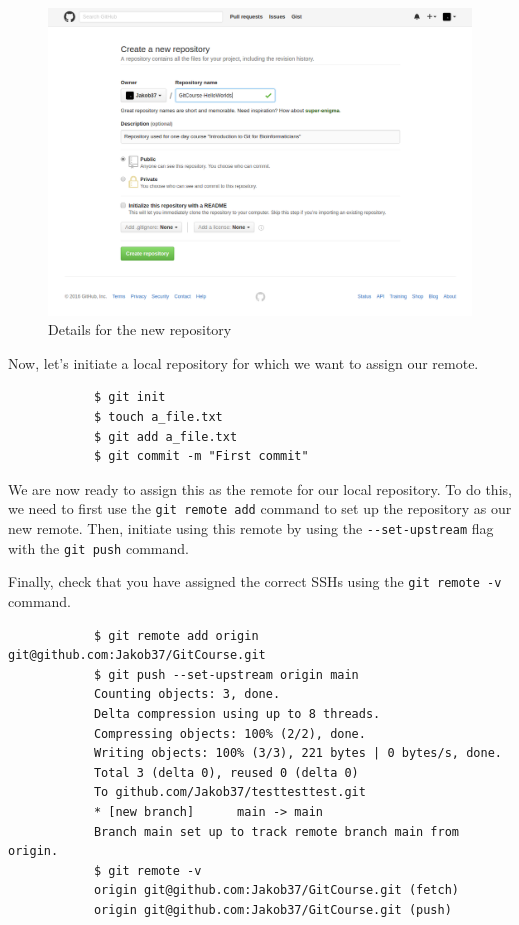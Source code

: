 \documentclass[../main/git_course_main.tex]{subfiles}
\begin{document}
	\begin{figure}[h!]
		\centering
		\includegraphics[width=1.0\textwidth]{../visualizations/screenshots/git_course_hello_worlds_repo.png}
		\caption{Details for the new repository}
		\label{fig:github_repo_details}
	\end{figure}
	
	Now, let's initiate a local repository for which we want to assign our remote.
	
	\begin{codebox}
		\begin{lstlisting}
			$ git init
			$ touch a_file.txt
			$ git add a_file.txt
			$ git commit -m "First commit"
		\end{lstlisting}
	\end{codebox}
	
	We are now ready to assign this as the remote for our local repository. To do this,
	we need to first use the \verb$git remote add$ command to set up the repository as our new remote. Then, initiate using this remote by using the \verb$--set-upstream$ flag with the \verb$git push$ command.
	
	Finally, check that you have assigned the correct SSHs using the \verb$git remote -v$ command.
	
	\begin{codebox}
		\begin{lstlisting}
			$ git remote add origin git@github.com:Jakob37/GitCourse.git
			$ git push --set-upstream origin main
			Counting objects: 3, done.
			Delta compression using up to 8 threads.
			Compressing objects: 100% (2/2), done.
			Writing objects: 100% (3/3), 221 bytes | 0 bytes/s, done.
			Total 3 (delta 0), reused 0 (delta 0)
			To github.com/Jakob37/testtesttest.git
			* [new branch]      main -> main
			Branch main set up to track remote branch main from origin.
			$ git remote -v
			origin git@github.com:Jakob37/GitCourse.git (fetch)
			origin git@github.com:Jakob37/GitCourse.git (push)
		\end{lstlisting}
	\end{codebox}
	
\end{document}
